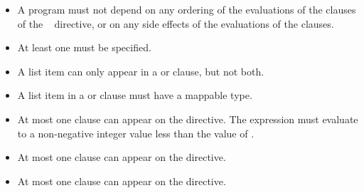 \restrictions
\begin{itemize}
\item A program must not depend on any ordering of the evaluations of the clauses of the
~ directive, or on any side effects of the evaluations of the clauses.


\item At least one  must be specified.

\item A list item can only appear in a  or  clause, but not both.

\item A list item in a  or  clause must have a mappable type.

\item At most one  clause can appear on the directive. The  expression
      must evaluate to a non-negative integer value less than the value
      of .

\item At most one  clause can appear on the directive.

\item At most one  clause can appear on the directive.
\end{itemize}


